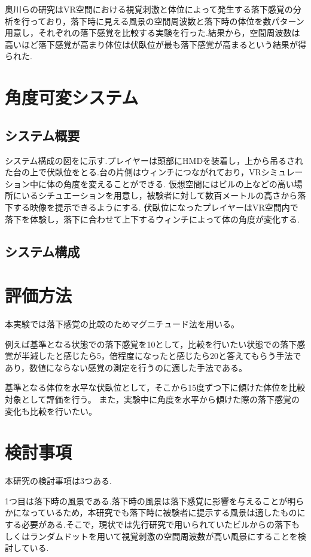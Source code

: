 \documentclass[uplatex]{jsarticle}
\begin{document}
奥川らの研究\cite{spatial_stimulation_effect_falling}はVR空間における視覚刺激と体位によって発生する落下感覚の分析を行っており，落下時に見える風景の空間周波数と落下時の体位を数パターン用意し，それぞれの落下感覚を比較する実験を行った.結果から，空間周波数は高いほど落下感覚が高まり体位は伏臥位が最も落下感覚が高まるという結果が得られた.


 

\section{角度可変システム}
\subsection{システム概要}
システム構成の図をに示す.プレイヤーは頭部にHMDを装着し，上から吊るされた台の上で伏臥位をとる.台の片側はウィンチにつながれており，VRシミュレーション中に体の角度を変えることができる.
仮想空間にはビルの上などの高い場所にいるシチュエーションを用意し，被験者に対して数百メートルの高さから落下する映像を提示できるようにする.
伏臥位になったプレイヤーはVR空間内で落下を体験し，落下に合わせて上下するウィンチによって体の角度が変化する.


 

\subsection{システム構成}


\section{評価方法}
本実験では落下感覚の比較のためマグニチュード法を用いる。

例えば基準となる状態での落下感覚を10として，比較を行いたい状態での落下感覚が半減したと感じたら5，倍程度になったと感じたら20と答えてもらう手法であり，数値にならない感覚の測定を行うのに適した手法である。

基準となる体位を水平な伏臥位として，そこから15度ずつ下に傾けた体位を比較対象として評価を行う。
また，実験中に角度を水平から傾けた際の落下感覚の変化も比較を行いたい。

\section{検討事項}
本研究の検討事項は3つある.

1つ目は落下時の風景である.落下時の風景は落下感覚に影響を与えることが明らかになっているため，本研究でも落下時に被験者に提示する風景は適したものにする必要がある.そこで，現状では先行研究で用いられていたビルからの落下もしくはランダムドットを用いて視覚刺激の空間周波数が高い風景にすることを検討している.
\end{document}
